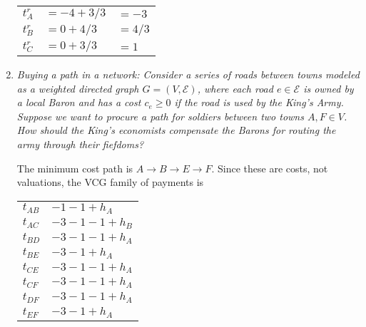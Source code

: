 \documentclass[letter, 10pt]{article}
\theoremstyle{basic}
\begin{document}
\begin{spacing}{1.0}
\begin{enumerate}
  \begin{tabular}{lll}
    $t_A^r$ & $= -4 + 3/3$ & $= -3$ \\
    $t_B^r$ & $= 0 + 4/3$ & $= 4/3$ \\
    $t_C^r$ & $= 0 + 3/3$ & $= 1$
  \end{tabular}

\item \textit{Buying a path in a network: Consider a series of roads
    between towns modeled as a weighted directed graph
    $G=(V,\mathcal{E})$, where each road $e\in \mathcal{E}$ is owned by a
    local Baron and has a cost $c_e \geq 0$ if the road is used by the
    King's Army. Suppose we want to procure a path for soldiers between
    two towns $A,F \in V$. How should the King's economists compensate the
    Barons for routing the army through their fiefdoms?}
    \begin{center}
    \end{center}

    The minimum cost path is $A\to B \to E \to F$. Since these are costs,
    not valuations, the VCG family of payments is

    \begin{tabular}{ll}
    $t_{AB}$ & $-1 -1 + h_A$ \\
    $t_{AC}$ & $-3-1-1 + h_B$ \\
    $t_{BD}$ & $-3-1-1 + h_A$ \\
    $t_{BE}$ & $-3-1 + h_A$ \\
    $t_{CE}$ & $-3-1-1 + h_A$ \\
    $t_{CF}$ & $-3-1-1 + h_A$ \\
    $t_{DF}$ & $-3-1-1 + h_A$ \\
    $t_{EF}$ & $-3-1 + h_A$
    \end{tabular}


\end{enumerate}
\end{spacing}
\end{document}
